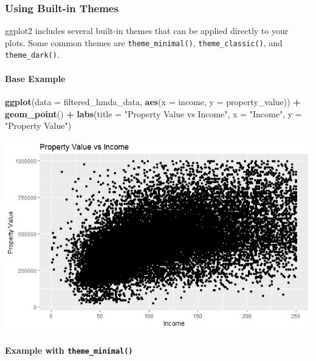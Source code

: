 \documentclass[
]{book}
\newenvironment{Shaded}{\begin{snugshade}}{\end{snugshade}}
\newcommand{\AttributeTok}[1]{\textcolor[rgb]{0.13,0.29,0.53}{#1}}
\newcommand{\FunctionTok}[1]{\textcolor[rgb]{0.13,0.29,0.53}{\textbf{#1}}}
\newcommand{\NormalTok}[1]{#1}
\newcommand{\SpecialCharTok}[1]{\textcolor[rgb]{0.81,0.36,0.00}{\textbf{#1}}}
\newcommand{\StringTok}[1]{\textcolor[rgb]{0.31,0.60,0.02}{#1}}
\begin{document}
\hypertarget{using-built-in-themes}{%
\subsubsection*{Using Built-in Themes}\label{using-built-in-themes}}

ggplot2 includes several built-in themes that can be applied directly to your plots. Some common themes are \texttt{theme\_minimal()}, \texttt{theme\_classic()}, and \texttt{theme\_dark()}.

\hypertarget{base-example}{%
\paragraph*{Base Example}\label{base-example}}

\begin{Shaded}
\begin{Highlighting}[]
\FunctionTok{ggplot}\NormalTok{(}\AttributeTok{data =}\NormalTok{ filtered\_hmda\_data, }\FunctionTok{aes}\NormalTok{(}\AttributeTok{x =}\NormalTok{ income, }\AttributeTok{y =}\NormalTok{ property\_value)) }\SpecialCharTok{+}
  \FunctionTok{geom\_point}\NormalTok{() }\SpecialCharTok{+}
  \FunctionTok{labs}\NormalTok{(}\AttributeTok{title =} \StringTok{"Property Value vs Income"}\NormalTok{,}
       \AttributeTok{x =} \StringTok{"Income"}\NormalTok{,}
       \AttributeTok{y =} \StringTok{"Property Value"}\NormalTok{)}
\end{Highlighting}
\end{Shaded}

\includegraphics{images/scatter plot.PNG}

\hypertarget{example-with-theme_minimal}{%
\paragraph*{\texorpdfstring{Example with \texttt{theme\_minimal()}}{Example with theme\_minimal()}}\label{example-with-theme_minimal}}
\end{document}
